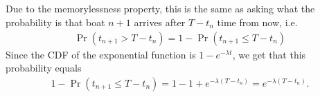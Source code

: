 \documentclass[]{article}
\begin{document}
\subsection{}
Due to the memorylessness property, this is the same as asking what the probability is that boat $n+1$ arrives after $T - t_n$ time from now, i.e.
\begin{equation}\begin{aligned}
\Pr(t_{n+1} > T - t_n) = 1-\Pr(t_{n+1} \leq T - t_n)
\end{aligned}\end{equation}
Since the CDF of the exponential function is $1 - e^{-\lambda t}$, we get that this probability equals
\begin{equation}\begin{aligned}
1-\Pr(t_{n+1} \leq T - t_n) = 1 - 1 + e^{-\lambda(T - t_n)} = e^{-\lambda(T-t_n)}.
\end{aligned}\end{equation}

\section{}
\end{document}
